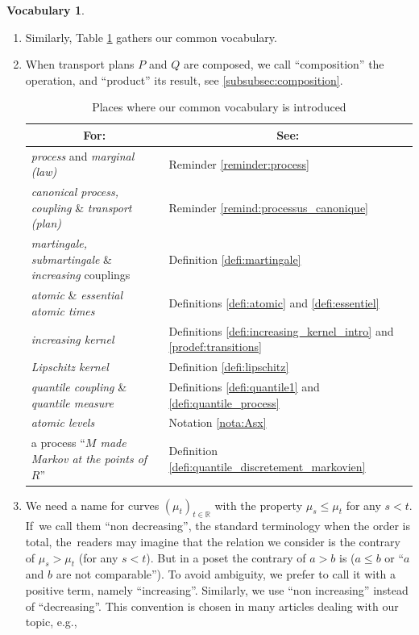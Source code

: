 \documentclass[JEP,XML,SOM,Unicode,NoEqCountersInSection,NoFloatCountersInSection,published]{cedram}
\theoremstyle{plain}
\theoremstyle{definition}
\newtheorem{vocabulary}[them]{Vocabulary}
\newcommand{\R}{\mathbb{R}}
\begin{document}
\skpt
\begin{vocabulary}
\begin{enumerate}
\item
Similarly, Table \ref{table:vocabulary} gathers our common vocabulary.

\item
When transport plans $P$ and $Q$ are composed, we call ``composition'' the oper\-a\-tion, and ``product'' its result, see \ref{subsubsec:composition}.
\begin{table}[htb]
\small\hspace*{\fill}\begin{tabular}{l|l}
\multicolumn{1}{c|}{For:}&\multicolumn{1}{c}{See:}\\\hline
\emph{process} and \emph{marginal (law)} & Reminder \ref{reminder:process}\\
\emph{canonical process, coupling} \& \emph{transport (plan)} & Reminder \ref{remind:processus_canonique}\\
\emph{martingale, submartingale} \& \emph{increasing} couplings
& Definition \ref{defi:martingale}\\
\emph{atomic} \& \emph{essential atomic times} & Definitions \ref{defi:atomic} and \ref{defi:essentiel}\\
\emph{increasing kernel} & Definitions \ref{defi:increasing_kernel_intro} and \ref{prodef:transitions}\\
\emph{Lipschitz kernel} & Definition \ref{defi:lipschitz}\\
\emph{quantile coupling} \& \emph{quantile measure} & Definitions \ref{defi:quantile1} and \ref{defi:quantile_process}\\
\emph{atomic levels} & Notation \ref{nota:Asx}\\
a process ``\emph{$M$ made Markov at the points of $R$}'' & Definition \ref{defi:quantile_discretement_markovien}\\
\end{tabular}\hspace*{\fill}\hspace*{\fill}\normalsize
\vspace*{.5\baselineskip}
\caption{\label{table:vocabulary}Places where our common vocabulary is introduced}
\end{table}

\item
We need a name for curves $(\mu_t)_{t\in\R}$ with the property $\mu_s\leqslant \mu_t$ for any \hbox{$s<t$}. If~we call them ``non decreasing'', the standard terminology when the order is total, the~readers may imagine that the relation we consider is the contrary of $\mu_s>\mu_t$ (for any $s<t$). But in a poset the contrary of $a>b$ is ($a\leq b$ or ``$a$ and $b$ are not comparable''). To avoid ambiguity, we prefer to call it with a positive term, namely ``increasing''. Similarly, we use ``non increasing'' instead of ``decreasing''. This convention is chosen in many articles dealing with our topic, e.g., \cite{SS,KaKr,Low2,HiRoYo14}
\end{enumerate}
\end{vocabulary}
\end{document}
